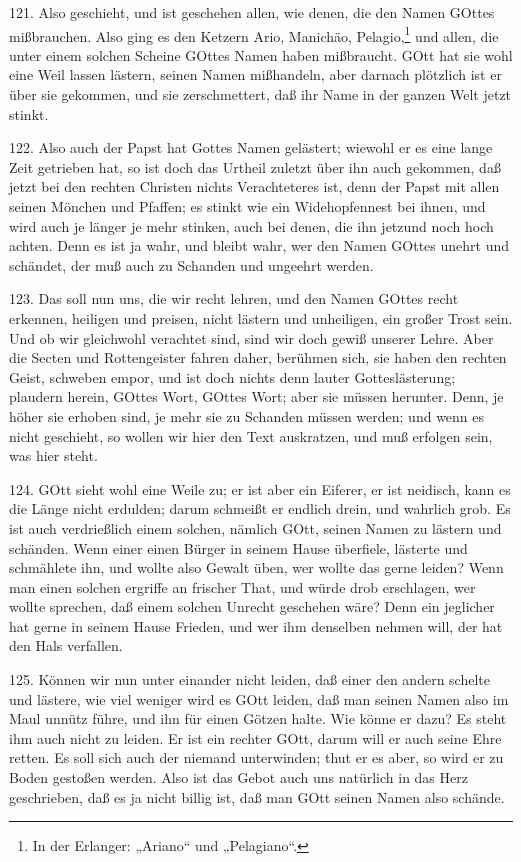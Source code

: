 121. Also geschieht, und ist geschehen allen, wie denen, die den Namen GOttes mißbrauchen. Also ging es den Ketzern Ario, Manichäo, Pelagio,\footnote{In der Erlanger: „Ariano“ und „Pelagiano“.} und allen, die unter einem solchen Scheine GOttes Namen haben mißbraucht. GOtt hat sie wohl eine Weil lassen lästern, seinen Namen mißhandeln, aber darnach plötzlich ist er über sie gekommen, und sie zerschmettert, daß ihr Name in der ganzen Welt jetzt stinkt.

122. Also auch der Papst hat Gottes Namen gelästert; wiewohl er es eine lange Zeit getrieben hat, so ist doch das Urtheil zuletzt über ihn auch gekommen, daß jetzt bei den rechten Christen nichts Verachteteres ist, denn der Papst mit allen seinen Mönchen und Pfaffen; es stinkt wie ein Widehopfennest bei ihnen, und wird auch je länger je mehr stinken, auch bei denen, die ihn jetzund noch hoch achten. Denn es ist ja wahr, und bleibt wahr, wer den Namen GOttes unehrt und schändet, der muß auch zu Schanden und ungeehrt werden.

123. Das soll nun uns, die wir recht lehren, und den Namen GOttes recht erkennen, heiligen und preisen, nicht lästern und unheiligen, ein großer Trost sein. Und ob wir gleichwohl verachtet sind, sind wir doch gewiß unserer Lehre. Aber die Secten und Rottengeister fahren daher, berühmen sich, sie haben den rechten Geist, schweben empor, und ist doch nichts denn lauter Gotteslästerung; plaudern herein, GOttes Wort, GOttes Wort; aber sie müssen herunter. Denn, je höher sie erhoben sind, je mehr sie zu Schanden müssen werden; und wenn es nicht geschieht, so wollen wir hier den Text auskratzen, und muß erfolgen sein, was hier steht.

124. GOtt sieht wohl eine Weile zu; er ist aber ein Eiferer, er ist neidisch, kann es die Länge nicht erdulden; darum schmeißt er endlich drein, und wahrlich grob. Es ist auch verdrießlich einem
solchen, nämlich GOtt, seinen Namen zu lästern und schänden. Wenn einer einen Bürger in seinem Hause überfiele, lästerte und schmählete ihn, und wollte also Gewalt üben, wer wollte das gerne leiden? Wenn man einen solchen ergriffe an frischer That, und würde drob erschlagen, wer wollte sprechen, daß einem solchen Unrecht geschehen wäre? Denn ein jeglicher hat gerne in seinem Hause Frieden, und wer ihm denselben nehmen will, der hat den Hals verfallen.

125. Können wir nun unter einander nicht leiden, daß einer den andern schelte und lästere, wie viel weniger wird es GOtt leiden, daß man seinen Namen also im Maul unnütz führe, und ihn für einen Götzen halte. Wie könne er dazu? Es steht ihm auch nicht zu leiden. Er ist ein rechter GOtt, darum will er auch seine Ehre retten. Es soll sich auch der niemand unterwinden; thut er es aber, so wird er zu Boden gestoßen werden. Also ist das Gebot auch uns natürlich in das Herz geschrieben, daß es ja nicht billig ist, daß man GOtt seinen Namen also schände.

